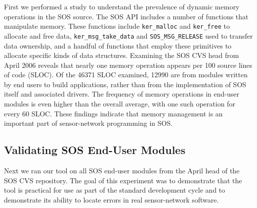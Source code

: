First we performed a study to understand the prevalence of
dynamic memory operations in the SOS source.
The SOS API includes a number of functions that manipulate memory.  These
functions include {\tt ker\_malloc} and {\tt ker\_free} to allocate and
free data, {\tt ker\_msg\_take\_data} and {\tt SOS\_MSG\_RELEASE} used to
transfer data ownership, and a handful of functions that employ these
primitives to 
allocate specific kinds of data structures.  Examining the SOS CVS head from April
2006 reveals that nearly one memory operation appears per
100 source lines of code (SLOC).  Of the 46371 SLOC examined, 12990 are from
modules written by end users to build applications, rather than from
the implementation of SOS itself and associated drivers.  The frequency of
memory operations in end-user modules is even higher than the overall average,
with one such operation for every 60 SLOC.  
These findings indicate that memory management is an important part of
sensor-network programming in SOS.

\subsection{Validating SOS End-User Modules}

Next we ran our tool on all SOS end-user modules from the
April head of the SOS CVS repository.  
The goal of this experiment was to demonstrate that the tool is
practical for use as part of the standard development cycle
and to demonstrate its ability to locate errors in real sensor-network
software.

%

